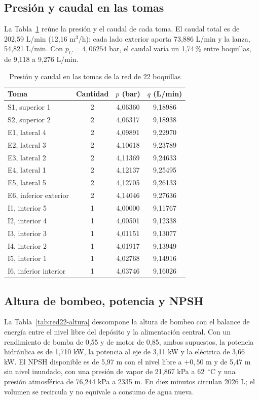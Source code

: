 \subsection{Presión y caudal en las tomas}

La Tabla~\ref{tab:red22-tomas} reúne la presión y el caudal de cada toma. El caudal total es de 202,59 L/min (12,16 m$^3$/h): cada lado exterior aporta 73,886 L/min y la lanza, 54,821 L/min. Con $p_C=4{,}06254$ bar, el caudal varía un 1,74\,\% entre boquillas, de 9,118 a 9,276 L/min.

\begin{table}[htbp]
\centering\small\singlespacing
\caption{Presión y caudal en las tomas de la red de 22 boquillas}
\label{tab:red22-tomas}
\begin{tabular}{lccc}
\toprule
\textbf{Toma} & \textbf{Cantidad} & \textbf{$p$ (bar)} & \textbf{$q$ (L/min)}\\
\midrule
S1, superior 1 & 2 & 4,06360 & 9,18986\\
S2, superior 2 & 2 & 4,06317 & 9,18938\\
E1, lateral 4 & 2 & 4,09891 & 9,22970\\
E2, lateral 3 & 2 & 4,10618 & 9,23789\\
E3, lateral 2 & 2 & 4,11369 & 9,24633\\
E4, lateral 1 & 2 & 4,12137 & 9,25495\\
E5, lateral 5 & 2 & 4,12705 & 9,26133\\
E6, inferior exterior & 2 & 4,14046 & 9,27636\\
I1, interior 5 & 1 & 4,00000 & 9,11767\\
I2, interior 4 & 1 & 4,00501 & 9,12338\\
I3, interior 3 & 1 & 4,01151 & 9,13077\\
I4, interior 2 & 1 & 4,01917 & 9,13949\\
I5, interior 1 & 1 & 4,02768 & 9,14916\\
I6, inferior interior & 1 & 4,03746 & 9,16026\\
\bottomrule
\end{tabular}
\end{table}

\subsection{Altura de bombeo, potencia y NPSH}

La Tabla~\ref{tab:red22-altura} descompone la altura de bombeo con el balance de energía entre el nivel libre del depósito y la alimentación central. Con un rendimiento de bomba de 0,55 y de motor de 0,85, ambos supuestos, la potencia hidráulica es de 1,710 kW, la potencia al eje de 3,11 kW y la eléctrica de 3,66 kW. El NPSH disponible es de 5,97 m con el nivel libre a $+0{,}50$ m y de 5,47 m sin nivel inundado, con una presión de vapor de 21,867 kPa a 62~$^\circ$C y una presión atmosférica de 76,244 kPa a 2335 m. En diez minutos circulan 2026 L; el volumen se recircula y no equivale a consumo de agua nueva.

